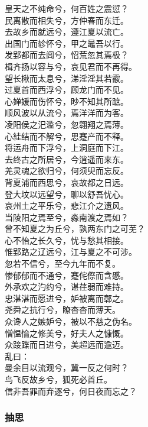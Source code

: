 \documentclass[]{article}
\begin{document}
皇天之不纯命兮，何百姓之震愆？\\
民离散而相失兮，方仲春而东迁。\\
去故乡而就远兮，遵江夏以流亡。\\
出国门而轸怀兮，甲之鼂吾以行。\\
发郢都而去闾兮，怊荒忽其焉极？\\
楫齐扬以容与兮，哀见君而不再得。\\
望长楸而太息兮，涕淫淫其若霰。\\
过夏首而西浮兮，顾龙门而不见。\\
心婵媛而伤怀兮，眇不知其所蹠。\\
顺风波以从流兮，焉洋洋而为客。\\
凌阳侯之汜滥兮，忽翱翔之焉薄。\\
心絓结而不解兮，思蹇产而不释。\\
将运舟而下浮兮，上洞庭而下江。\\
去终古之所居兮，今逍遥而来东。\\
羌灵魂之欲归兮，何须臾而忘反。\\
背夏浦而西思兮，哀故都之日远。\\
登大坟以远望兮，聊以舒吾忧心。\\
哀州土之平乐兮，悲江介之遗风。\\
当陵阳之焉至兮，淼南渡之焉如？\\
曾不知夏之为丘兮，孰两东门之可芜？\\
心不怡之长久兮，忧与愁其相接。\\
惟郢路之辽远兮，江与夏之不可涉。\\
忽若不信兮，至今九年而不复。\\
惨郁郁而不通兮，蹇侘傺而含慼。\\
外承欢之汋约兮，谌荏弱而难持。\\
忠湛湛而愿进兮，妒被离而鄣之。\\
尧舜之抗行兮，瞭杳杳而薄天。\\
众谗人之嫉妒兮，被以不慈之伪名。\\
憎愠惀之修美兮，好夫人之慷慨。\\
众踥蹀而日进兮，美超远而逾迈。\\
乱曰：\\
曼余目以流观兮，冀一反之何时？\\
鸟飞反故乡兮，狐死必首丘。\\
信非吾罪而弃逐兮，何日夜而忘之？

\hypertarget{header-n95}{%
\subsubsection{抽思}\label{header-n95}}
\end{document}
